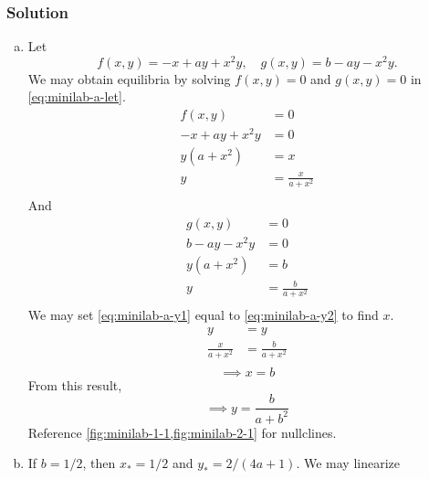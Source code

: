 \documentclass[12pt]{article}
\begin{document}
\subsubsection*{Solution}
\begin{enumerate}[(a)]
\item
  Let
  \begin{equation}
    \label{eq:minilab-a-let}
    f(x,y)=-x+ay+x^2y,\quad g(x,y)=b-ay-x^2y.
  \end{equation}
  We may obtain equilibria by solving $f(x,y)=0$ and $g(x,y)=0$ in \cref{eq:minilab-a-let}.
  \begin{equation}
    \label{eq:minilab-a-y1}
    \begin{aligned}
      f(x,y) &= 0 \\
      -x+ay+x^2y &= 0 \\
      y(a+x^2) &= x \\
      y &= \frac{x}{a+x^2} \\
    \end{aligned}
  \end{equation}
  And
  \begin{equation}
    \label{eq:minilab-a-y2}
    \begin{aligned}
      g(x,y) &= 0 \\
      b-ay-x^2y &= 0 \\
      y(a+x^2) &= b \\
      y &= \frac{b}{a+x^2} \\
    \end{aligned}
  \end{equation}
  We may set \cref{eq:minilab-a-y1} equal to \cref{eq:minilab-a-y2} to find $x$.
  \begin{equation*}
    \begin{aligned}
      y &= y \\
      \frac{x}{a+x^2} &= \frac{b}{a+x^2} \\
    \end{aligned}
  \end{equation*}
  \begin{equation*}
    \boxed{\implies x = b}
  \end{equation*}
  From this result,
  \begin{equation*}
    \boxed{
      \implies y = \frac{b}{a+b^2}
    }
  \end{equation*}
  Reference \cref{fig:minilab-1-1,fig:minilab-2-1} for nullclines.
\newpage
\item If $b=1/2$, then $x_*=1/2$ and $y_*=2/(4a+1)$. We may linearize

\end{enumerate}
\end{document}
